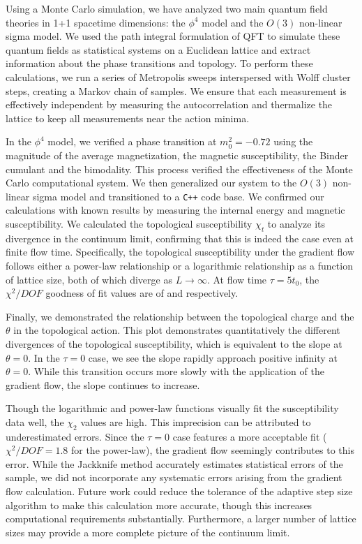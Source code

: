 Using a Monte Carlo simulation, we have analyzed two main quantum field theories in 1+1 spacetime dimensions: the $\phi^4$ model and the $O(3)$ non-linear sigma model. We used the path integral formulation of QFT to simulate these quantum fields as statistical systems on a Euclidean lattice and extract information about the phase transitions and topology. To perform these calculations, we run a series of Metropolis sweeps interspersed with Wolff cluster steps, creating a Markov chain of samples. We ensure that each measurement is effectively independent by measuring the autocorrelation and thermalize the lattice to keep all measurements near the action minima.

In the $\phi^4$ model, we verified a phase transition at $m_0^2=-0.72$ using the magnitude of the average magnetization, the magnetic susceptibility, the Binder cumulant and the bimodality. This process verified the effectiveness of the Monte Carlo computational system. We then generalized our system to the $O(3)$ non-linear sigma model and transitioned to a \texttt{C++} code base. We confirmed our calculations with known results by measuring the internal energy and magnetic susceptibility. We calculated the topological susceptibility $\chi_t$ to analyze its divergence in the continuum limit, confirming that this is indeed the case even at finite flow time. Specifically, the topological susceptibility under the gradient flow follows either a power-law relationship or a logarithmic relationship as a function of lattice size, both of which diverge as $L\rightarrow\infty$.  At flow time $\tau=5t_0$, the $\chi^2/DOF$ goodness of fit values are of \powchi and \logchi respectively. 

Finally, we demonstrated the relationship between the topological charge and the $\theta$ in the topological action. This plot demonstrates quantitatively the different divergences of the topological susceptibility, which is equivalent to the slope at $\theta=0$. In the $\tau=0$ case, we see the slope rapidly approach positive infinity at $\theta=0$. While this transition occurs more slowly with the application of the gradient flow, the slope continues to increase.

Though the logarithmic and power-law functions visually fit the susceptibility data well, the $\chi_2$ values are high. This imprecision can be attributed to underestimated errors. Since the $\tau=0$ case features a more acceptable fit ($\chi^2/DOF=1.8$ for the power-law), the gradient flow seemingly contributes to this error. While the Jackknife method accurately estimates statistical errors of the sample, we did not incorporate any systematic errors arising from the gradient flow calculation. Future work could reduce the tolerance of the adaptive step size algorithm to make this calculation more accurate, though this increases computational requirements substantially. Furthermore, a larger number of lattice sizes may provide a more complete picture of the continuum limit.

